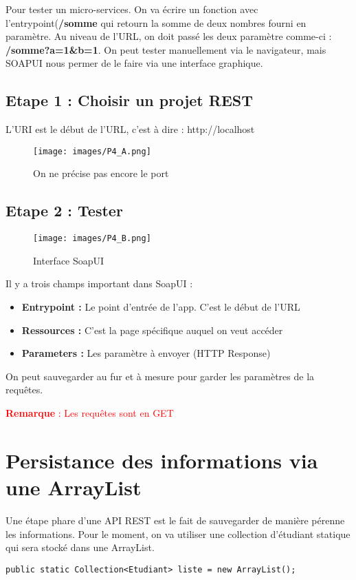 \documentclass{rapport}
\begin{document}
Pour tester un micro-services. On va écrire un fonction avec l'entrypoint(\textbf{/somme} qui retourn la somme de deux nombres fourni en paramètre. Au niveau de l'URL, on doit passé les deux paramètre comme-ci : \textbf{/somme?a=1&b=1}. On peut tester manuellement via le navigateur, mais SOAPUI nous permer de le faire via une interface graphique.

\subsection{Etape 1 : Choisir un projet REST}

L'URI est le début de l'URL, c'est à dire : http://localhost

\begin{figure}[H]
	\centering
    \texttt{[image: images/P4\_A.png]}
    \caption{On ne précise pas encore le port}
\end{figure}

\subsection{Etape 2 : Tester}

\begin{figure}[H]
	\centering
    \texttt{[image: images/P4\_B.png]}
    \caption{Interface SoapUI}
\end{figure}

Il y a trois champs important dans SoapUI :
\begin{itemize}
	\item \textbf{Entrypoint :} Le point d'entrée de l'app. C'est le début de l'URL
	\item \textbf{Ressources : } C'est la page spécifique auquel on veut accéder
	\item \textbf{Parameters : } Les paramètre à envoyer (HTTP Response)
\end{itemize}
On peut sauvegarder au fur et à mesure pour garder les paramètres de la requêtes.

\textcolor{red}{\textbf{Remarque} : Les requêtes sont en GET}

\section{Persistance des informations via une ArrayList}

Une étape phare d'une API REST est le fait de sauvegarder de manière pérenne les informations. Pour le moment, on va utiliser une collection d'étudiant statique qui sera stocké dans une ArrayList.\newline
\begin{lstlisting}
public static Collection<Etudiant> liste = new ArrayList();
\end{lstlisting}
\end{document}
